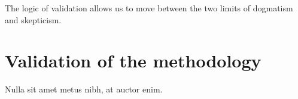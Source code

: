 

\begin{savequote}[50mm]
The logic of validation allows us to move between the two limits of dogmatism and skepticism. 
\end{savequote}


\chapter{Validation of the methodology}
\label{cha:Validation of the methodology}

\ifpdf
    \graphicspath{{4_experiments_and_results/figures/PNG/}{4_experiments_and_results/figures/PDF/}{4_experiments_and_results/figures/}}
\else
    \graphicspath{{4_experiments_and_results/figures/EPS/}{4_experiments_and_results/figures/}}
\fi



Nulla sit amet metus nibh, at auctor enim.







